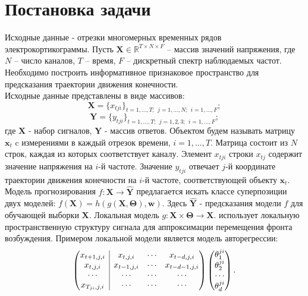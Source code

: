 \documentclass[12pt,twoside]{article}
\begin{document}
\section{Постановка задачи}
Исходные данные - отрезки многомерных временных рядов электрокортикограммы. Пусть $\mathbf{X} \in \mathbb{R}^{T \times N \times F}$ – массив значений напряжения, где $N$ – число каналов, $T$ – время, $F$ – дискретный спектр наблюдаемых частот. Необходимо построить информативное признаковое пространство для предсказания траектории движения конечности. \\
Исходные данные представлены в виде массивов:
\begin{equation}
\mathbf{X} = \{x_{tji}\}_{t=1,\dots,T;\ \ j=1,\dots,N;\ \ i=1,\dots,F};
\end{equation} 
\begin{equation}
\mathbf{Y} = \{y_{tji}\}_{t=1,\dots,T;\ \ j=1,2,3;\ \ i=1,\dots,F};
\end{equation}
где $\mathbf{X}$ - набор сигналов, $\mathbf{Y}$ - массив ответов. Объектом будем называть матрицу $\mathbf{x}_t$ c измерениями в каждый отрезок времени, $i = 1,\dots,T$. Матрица состоит из $N$ строк, каждая из которых соответствует каналу. Элемент $x_{tji}$ строки $x_{tj}$ содержит значение напряжения на $i$-й частоте. Значение $y_{tji}$ отвечает $j$-й координате траектории движения конечности на $i$-й частоте, соответствующей объекту $\mathbf{x}_t$.\\
Модель прогнозирования $f:\mathbf{X}\to\mathbf{\hat{Y}}$ предлагается искать классе суперпозиции двух моделей: $f(\mathbf{X})=h(g(\mathbf{X}, \mathbf{\Theta}), \mathbf{w})$. Здесь $\mathbf{\hat{Y}}$ - предсказания модели $f$ для обучающей выборки $\mathbf{X}$. Локальная модель $g:\mathbf{X}\times\mathbf{\Theta}\to\mathbf{X}$. использует локальную пространственную структуру сигнала для аппроксимации перемещения фронта возбуждения.
 Примером локальной модели является модель авторегрессии:
\begin{equation}
\left(\begin{array}{@{}c|ccc@{}}
x_{t+1,j,i} & x_{t,j,i}   & \cdots & x_{t-d,j,i}   \\
x_{t,j,i}   & x_{t-1,j,i} & \cdots & x_{t-d-1,j,i} \\
\cdots     & \cdots     & \cdots & \cdots	\\
x_{T_{ji},j,i}   & \cdots     & \cdots & \cdots   \\
\end{array}\right)
\begin{pmatrix}
\theta_1^{ji} \\
\theta_2^{ji} \\
\cdots \\
\theta_d^{ji}
\end{pmatrix}.
\end{equation}
\end{document}
